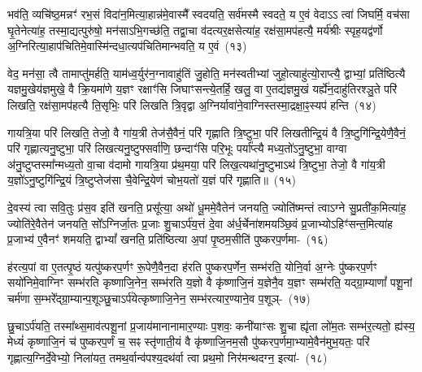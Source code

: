 भव॑ति॒ व्यचि॑ष्ठ॒मन्नꣳ॑ रभ॒सं विदा॑न॒मित्या॒हान्न॑मे॒वास्मै᳚ स्वदयति॒ सर्व॑मस्मै स्वदते॒ य ए॒वं वेदा\-ऽऽ त्वा॑ जिघर्मि॒ वच॑सा घृ॒तेनेत्या॑ह॒ तस्मा॒द्यत्पुरु॑षो॒ मन॑सा\-ऽ\-भि॒गच्छ॑ति॒ तद्वा॒चा व॑दत्यर॒क्षसेत्या॑ह॒ रक्ष॑सा॒मप॑हत्यै॒ मर्य॑श्रीः स्पृह॒यद्व॑र्णो अ॒ग्निरित्या॒हाप॑\-चितिमे॒वास्मि॑न्दधा॒त्यप॑\-चितिमान्भवति॒ य ए॒वं~(१३)\ip

वेद॒ मन॑सा॒ त्वै तामाप्तु॑मर्\mbox{}हति॒ याम॑ध्व॒र्युर॑न॒ग्नावाहु॑तिं जु॒होति॒ मन॑स्वतीभ्यां जुहो॒त्याहु॑त्यो॒राप्त्यै॒ द्वाभ्यां॒ प्रति॑ष्ठित्यै यज्ञमु॒खेय॑ज्ञमुखे॒ वै क्रि॒यमा॑णे य॒ज्ञꣳ रक्षाꣳ॑सि जिघाꣳसन्त्ये॒तर्\mbox{}हि॒ खलु॒ वा ए॒तद्य॑ज्ञमु॒खं यर्\mbox{}ह्ये॑न॒दाहु॑तिरश्ञु॒ते परि॑ लिखति॒ रक्ष॑सा॒मप॑हत्यै ति॒सृभिः॒ परि॑ लिखति त्रि॒वृद्वा अ॒ग्निर्यावा॑ने॒वाग्निस्तस्मा॒द्रक्षा॒ꣴ॒स्यप॑ हन्ति~(१४)\ip

गायत्रि॒या परि॑ लिखति॒ तेजो॒ वै गा॑य॒त्री तेज॑सै॒वैनं॒ परि॑ गृह्णाति त्रि॒ष्टुभा॒ परि॑ लिखतीन्द्रि॒यं वै त्रि॒ष्टुगि॑न्द्रि॒येणै॒वैनं॒ परि॑ गृह्णात्यनु॒ष्टुभा॒ परि॑ लिखत्यनु॒ष्टुफ्सर्वा॑णि॒ छन्दाꣳ॑सि परि॒भूः पर्या᳚प्त्यै मध्य॒तो॑\-ऽनु॒ष्टुभा॒ वाग्वा अ॑नु॒ष्टुप्तस्मा᳚न्मध्य॒तो वा॒चा व॑दामो गायत्रि॒या प्र॑थ॒मया॒ परि॑ लिख॒त्यथा॑नु॒ष्टुभाऽथ॑ त्रि॒ष्टुभा॒ तेजो॒ वै गा॑य॒त्री य॒ज्ञो॑\-ऽनु॒ष्टुगि॑न्द्रि॒यं त्रि॒ष्टुप्तेज॑सा चै॒वेन्द्रि॒येण॑ चोभ॒यतो॑ य॒ज्ञं परि॑ गृह्णाति॥~(१५)\ip

{\anuvakamend[{अ॒न्धो᳚\-ऽध्व॒र्युर्म॒हान्भ॑वति त्रि॒ष्टुभा॒ तेजो॒ वै गा॑य॒त्री त्रयो॑दश च}]}

दे॒वस्य॑ त्वा सवि॒तुः प्र॑स॒व इति॑ खनति॒ प्रसू᳚त्या॒ अथो॑ धू॒ममे॒वैतेन॑ जनयति॒ ज्योति॑ष्मन्तं त्वाऽग्ने सु॒प्रती॑क॒मित्या॑ह॒ ज्योति॑रे॒वैतेन॑ जनयति॒ सो᳚\-ऽग्निर्जा॒तः प्र॒जाः शु॒चा\-ऽ\-र्प॑य॒त्तं दे॒वा अ॑र्ध॒र्चेना॑शमयञ्छि॒वं प्र॒जाभ्यो\-ऽहिꣳ॑सन्त॒मित्या॑ह प्र॒जाभ्य॑ ए॒वैनꣳ॑ शमयति॒ द्वा\-भ्यां᳚ खनति॒ प्रति॑ष्ठित्या अ॒पां पृ॒ष्ठम॒सीति॑ पुष्करप॒र्णमा-~(१६)\ip

ह॑रत्य॒पां वा ए॒तत्पृ॒ष्ठं यत्पु॑ष्करप॒र्णꣳ रू॒पेणै॒वैन॒दा ह॑रति पुष्करप॒र्णेन॒ सम्भ॑रति॒ योनि॒र्वा अ॒ग्नेः पु॑ष्करप॒र्णꣳ सयो॑निमे॒वाग्निꣳ सम्भ॑रति कृष्णाजि॒नेन॒ सम्भ॑रति य॒ज्ञो वै कृ॑ष्णाजि॒नं य॒ज्ञेनै॒व य॒ज्ञꣳ सम्भ॑रति॒ यद्ग्रा॒म्याणां᳚ पशू॒नां चर्म॑णा स॒म्भरे᳚द्ग्रा॒म्यान्प॒शूञ्छु॒चा\-ऽर्प॑येत्कृष्णाजि॒नेन॒ सम्भ॑रत्यार॒ण्याने॒व प॒शूञ्-~(१७)\ip

छु॒चा\-ऽर्प॑यति॒ तस्मा᳚थ्स॒माव॑त्पशू॒नां प्र॒जाय॑मानानामार॒ण्याः प॒शवः॒ कनी॑याꣳसः शु॒चा ह्यृ॑ता लो॑म॒तः सम्भ॑र॒त्यतो॒ ह्य॑स्य॒ मेध्यं॑ कृष्णाजि॒नं च॑ पुष्करप॒र्णं च॒ सꣴ स्तृ॑णाती॒यं वै कृ॑ष्णाजि॒नम॒सौ पु॑ष्करप॒र्णमा॒भ्यामे॒वैन॑मुभ॒यतः॒ परि॑ गृह्णात्य॒ग्निर्दे॒वेभ्यो॒ निला॑यत॒ तमथ॒र्वान्व॑पश्य॒दथ॑र्वा त्वा प्रथ॒मो निर॑मन्थदग्न॒ इत्या॑-~(१८)\ip

